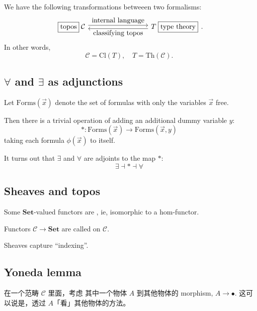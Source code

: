 We have the following transformations betweeen two formalisms:
\begin{equation}
\begin{tikzcd}[column sep = 20ex]
\boxed{\mbox{topos}} \; \mathcal{C}
\arrow[r, shift left, "\mbox{internal language}"]
& T \; \boxed{\mbox{type theory}}
\arrow[l, shift left, "\mbox{classifying topos}"]
\end{tikzcd}.
\end{equation}
In other words,
\begin{equation}
\mathcal{C} = \mathrm{Cl}(T), \quad T = \mathrm{Th}(\mathcal{C}).
\end{equation}

\subsection{$\forall$ and $\exists$ as adjunctions}

Let $\mbox{Forms}(\vec{x})$ denote the set of formulas with only the variables $\vec{x}$ free.

Then there is a trivial operation of adding an additional dummy variable $y$:
\begin{equation}
* : \mbox{Forms}(\vec{x}) \rightarrow \mbox{Forms}(\vec{x}, y)
\end{equation}
taking each formula $\phi(\vec{x})$ to itself.

It turns out that $\exists$ and $\forall$ are adjoints to the map $*$:
\begin{equation}
\exists \dashv * \dashv \forall
\end{equation}

\subsection{Sheaves and topos}

Some $\mathbf{Set}$-valued functors are , ie, isomorphic to a hom-functor.

Functors $\mathcal{C} \rightarrow \mathbf{Set}$ are called  on $\mathcal{C}$.

Sheaves capture ``indexing''.

\subsection{Yoneda lemma}

在一个范畴 $\mathcal{C}$ 里面，考虑 其中一个物体 $A$ 到其他物体的 morphism, $A \rightarrow \bullet$.  这可以说是，透过 $A$「看」其他物体的方法。

